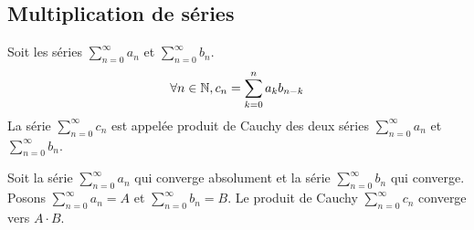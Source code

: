 	\subsection{Multiplication de séries}
		\begin{mydef}
			Soit les séries $\sum_{n=0}^{\infty}a_n$ et $\sum_{n=0}^{\infty}b_n$. 
			\[\forall n\in\mathbb{N}, c_n=\sum_{k=0}^{n}a_kb_{n-k}\]
			La série $\sum_{n=0}^{\infty}c_n$ est appelée produit de Cauchy des deux séries $\sum_{n=0}^{\infty}a_n$ et $\sum_{n=0}^{\infty}b_n$.
		\end{mydef}
		\begin{mythm}
			Soit la série $\sum_{n=0}^{\infty}a_n$ qui converge absolument et la série $\sum_{n=0}^{\infty}b_n$ qui converge. Posons $\sum_{n=0}^{\infty}a_n=A$ et $\sum_{n=0}^{\infty}b_n=B$. Le produit de Cauchy $\sum_{n=0}^{\infty}c_n$ converge vers $A\cdot B$.
		\end{mythm}